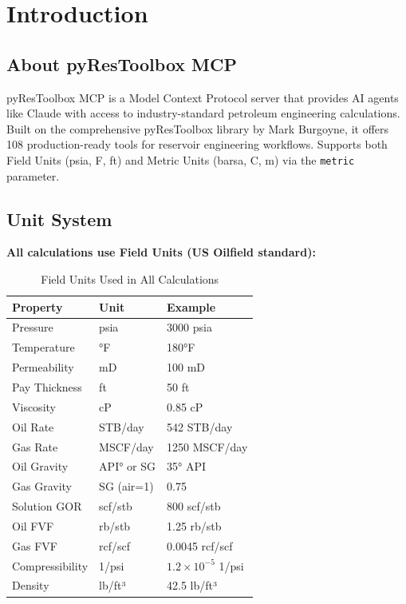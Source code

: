 \documentclass[11pt,a4paper]{article}
\begin{document}
\section{Introduction}

\subsection{About pyResToolbox MCP}
pyResToolbox MCP is a Model Context Protocol server that provides AI agents like Claude with access to industry-standard petroleum engineering calculations. Built on the comprehensive pyResToolbox library by Mark Burgoyne, it offers 108 production-ready tools for reservoir engineering workflows. Supports both Field Units (psia, \textdegree F, ft) and Metric Units (barsa, \textdegree C, m) via the \texttt{metric} parameter.

\subsection{Unit System}
\textbf{All calculations use Field Units (US Oilfield standard):}

\begin{table}[h]
\centering
\begin{tabular}{lll}
\toprule
\textbf{Property} & \textbf{Unit} & \textbf{Example} \\
\midrule
Pressure & psia & 3000 psia \\
Temperature & °F & 180°F \\
Permeability & mD & 100 mD \\
Pay Thickness & ft & 50 ft \\
Viscosity & cP & 0.85 cP \\
Oil Rate & STB/day & 542 STB/day \\
Gas Rate & MSCF/day & 1250 MSCF/day \\
Oil Gravity & API° or SG & 35° API \\
Gas Gravity & SG (air=1) & 0.75 \\
Solution GOR & scf/stb & 800 scf/stb \\
Oil FVF & rb/stb & 1.25 rb/stb \\
Gas FVF & rcf/scf & 0.0045 rcf/scf \\
Compressibility & 1/psi & $1.2 \times 10^{-5}$ 1/psi \\
Density & lb/ft³ & 42.5 lb/ft³ \\
\bottomrule
\end{tabular}
\caption{Field Units Used in All Calculations}
\end{table}
\end{document}
